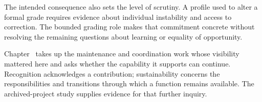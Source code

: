 The intended consequence also sets the level of scrutiny. A profile used to alter a formal grade requires evidence about individual instability and access to correction. The bounded grading role makes that commitment concrete without resolving the remaining questions about learning or equality of opportunity.

Chapter~ takes up the maintenance and coordination work whose visibility mattered here and asks whether the capability it supports can continue. Recognition acknowledges a contribution; sustainability concerns the responsibilities and transitions through which a function remains available. The archived-project study supplies evidence for that further inquiry.
